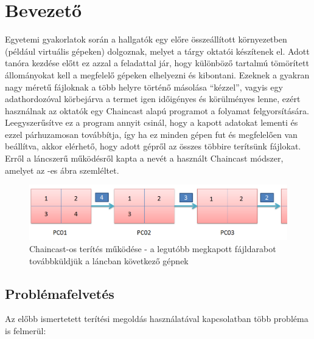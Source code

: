\chapter{Bevezető} 

Egyetemi gyakorlatok során a hallgatók egy előre összeállított környezetben (például virtuális
gépeken) dolgoznak, melyet a tárgy oktatói készítenek el. Adott tanóra kezdése előtt 
ez azzal a feladattal jár, hogy különböző tartalmú tömörített állományokat kell a megfelelő gépeken elhelyezni és kibontani. Ezeknek a gyakran nagy méretű fájloknak a több helyre történő másolása ``kézzel'', vagyis egy adathordozóval körbejárva a termet igen időigényes és körülményes lenne, ezért használnak az oktatók egy Chaincast\cite{kiraly2011chaincast} alapú programot a folyamat felgyorsítására. Leegyszerűsítve ez a program annyit csinál, hogy a kapott adatokat lementi és ezzel párhuzamosan továbbítja, így ha ez minden gépen fut és megfelelően van beállítva, akkor elérhető, hogy adott gépről az összes többire terítsünk fájlokat. Erről a láncszerű működésről kapta a nevét a használt Chaincast módszer, amelyet az -es ábra szemléltet.

\begin{figure}[ht]
\centering
\includegraphics[width=140mm, keepaspectratio]{figures/chaincast.png}
\caption{Chaincast-os terítés működése - a legutóbb megkapott fájldarabot továbbküldjük a láncban következő gépnek}
\label{fig:chaincast}
\end{figure}

\section{Problémafelvetés}

Az előbb ismertetett terítési megoldás használatával kapcsolatban több probléma is felmerül:

